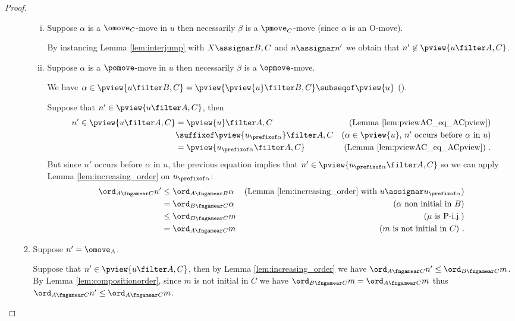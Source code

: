 \begin{proof}
\begin{enumerate}[1)]
\begin{enumerate}
\begin{enumerate}[i.]
\item Suppose $\alpha$ is a $\omove_C$-move in $u$ then necessarily
$\beta$ is a $\pmove_C$-move (since $\alpha$ is an O-move).

By instancing Lemma \ref{lem:interjump} with
$X\assignar B,C$ and $n \assignar n'$ we obtain that $n' \not\in\pview{u \filter A,C}$.

\item Suppose $\alpha$ is a $\pomove$-move in $u$ then necessarily $\beta$ is a $\opmove$-move.

We have $\alpha \in \pview{u \filter B,C}
= \pview{\pview{u} \filter B,C} \subseqof
\pview{u}$ (\cite[Lemma 3.3.1]{Harmer2005}).

Suppose that $n' \in \pview{u\filter A,C}$, then 
\begin{align*}
n'  \in \pview{u\filter A,C} 
& = \pview{u}\filter A,C   
& \mbox{(Lemma \ref{lem:pviewAC_eq_ACpview})} \\
& \suffixof \pview{u_{\prefixof \alpha}}\filter A,C
& \mbox{($\alpha \in \pview{u}$, $n'$ occurs before $\alpha$ in $u$)} \\
& = \pview{u_{\prefixof \alpha} \filter A,C} 
& \mbox{(Lemma \ref{lem:pviewAC_eq_ACpview})}\ .
\end{align*}
But since $n'$ occurs before $\alpha$ in $u$, the previous equation 
implies that $n' \in \pview{u_{\prefixof \alpha}\filter A,C}$
so we can apply Lemma \ref{lem:increasing_order}
on $u_{\prefixof \alpha}$: 
\begin{align*}
\ord_{A\fngamear C} n' 
& \leq \ord_{A\fngamear B} \alpha & \mbox{(Lemma \ref{lem:increasing_order} with $u\assignar u_{\prefixof \alpha}$)} \\
& = \ord_{B\fngamear C} \alpha & \mbox{($\alpha$ non initial in $B$)} \\
& \leq \ord_{B\fngamear C} m & \mbox{($\mu$ is P-i.j.)} \\
& = \ord_{A\fngamear C} m & \mbox{($m$ is not initial in $C$)} \ .
\end{align*}
\end{enumerate}


\item Suppose $n' =\omove_A$.

Suppose that $n' \in \pview{u\filter A,C}$, then by
Lemma \ref{lem:increasing_order} we have
$ \ord_{A\fngamear C} n'  \leq \ord_{B\fngamear C} m$.
 By Lemma \ref{lem:compositionorder}, since
 $m$ is not initial in $C$ we have $\ord_{B\fngamear C} m = \ord_{A\fngamear C} m$ thus $\ord_{A\fngamear C} n' \leq \ord_{A\fngamear C} m$.
\end{enumerate}


\end{enumerate}
\end{proof}
